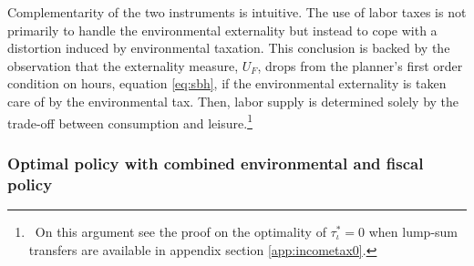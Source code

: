  
 
Complementarity of the two instruments is intuitive. The use of labor taxes is not primarily to handle the environmental externality but instead to cope with a distortion induced by environmental taxation. 
This conclusion is backed by the observation that the externality measure, $U_F$, drops from the planner's first order condition on hours, equation \ref{eq:sbh}, if the environmental externality is taken care of by the environmental tax. Then, labor supply is determined solely by the trade-off between consumption and leisure.\footnote{\ On this argument see the proof on the optimality of $\tau_\iota^*=0$ when lump-sum transfers are available in appendix section \ref{app:incometax0}.} 

 

 

\subsubsection{Optimal policy with combined environmental and fiscal policy}\label{subsec:integrated}

